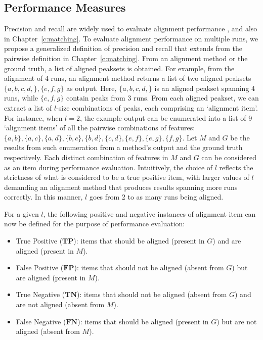 \subsection{Performance Measures}
\label{sub:Performance-Measures}

Precision and recall are widely used to evaluate alignment performance \cite{Lange2008, Pluskal2010, Ballardini2011, Voss2011a, Sandin2013}, and also in Chapter~\ref{c:matching}. To evaluate alignment performance on multiple runs, we propose a generalized definition of precision and recall that extends from the pairwise definition in Chapter~\ref{c:matching}. From an alignment method or the ground truth, a list of aligned peaksets is obtained. For example, from the alignment of 4 runs, an alignment method returns a list of two aligned peaksets $\{a,b,c,d,\},\allowbreak\{e,f,g\}$ as output. Here, $\{a,b,c,d,\}$ is an aligned peakset spanning 4 runs, while $\{e,f,g\}$ contain peaks from 3 runs. From each aligned peakset, we can extract a list of $l$-size combinations of peaks, each comprising an `alignment item'. For instance, when $l=2$, the example output can be enumerated into a list of 9 `alignment items' of all the pairwise combinations of features: $\{a,b\},\allowbreak\{a,c\},\allowbreak\{a,d\},\allowbreak\{b,c\},\allowbreak\{b,d\},\allowbreak\{c,d\},\allowbreak\{e,f\},\allowbreak\{e,g\},\allowbreak\{f,g\}$. Let $M$ and $G$ be the results from such enumeration from a method's output and the ground truth respectively. Each distinct combination of features in $M$ and $G$ can be considered as an item during performance evaluation. Intuitively, the choice of $l$ reflects the strictness of what is considered to be a true positive item, with larger values of $l$ demanding an alignment method that produces results spanning more runs correctly. In this manner, $l$ goes from 2 to as many runs being aligned.

For a given $l$, the following positive and negative instances of alignment item can now be defined for the purpose of performance evaluation:
\begin{itemize}
\item True Positive ($\boldsymbol{TP}$): items that should be aligned (present in $G$) and are aligned (present in $M$).
\item False Positive ($\boldsymbol{FP}$): items that should not be aligned (absent from $G$) but are aligned (present in $M$).
\item True Negative ($\boldsymbol{TN}$): items that should not be aligned (absent from $G$) and are not aligned (absent from $M$).
\item False Negative ($\boldsymbol{FN}$): items that should be aligned (present in $G$) but are not aligned (absent from $M$).
\end{itemize}

